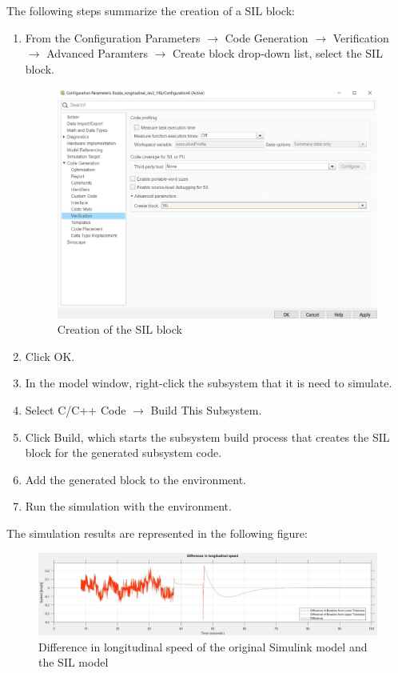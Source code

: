 \documentclass[12pt,a4paper]{report}
\begin{document}
The following steps summarize the creation of a SIL block:
\begin{enumerate}
	\item From the Configuration Parameters $\to$  Code Generation $\to$  Verification $\to$  Advanced Paramters $\to$  Create block drop-down list, select the SIL block.
	\begin{figure}[htbp]
		\centering
		\includegraphics[scale=0.4]{verification.jpg}
		\caption{Creation of the SIL block}
	\end{figure} \FloatBarrier
	\item Click OK.
	\item In the model window, right-click the subsystem that it is need to simulate.
	\item Select C/C++ Code $\to$  Build This Subsystem.
	\item Click Build, which starts the subsystem build process that creates the SIL block for the generated subsystem code.
	\item Add the generated block to the environment.
	\item Run the simulation with the environment.
\end{enumerate}

The simulation results are represented in the following figure:
\begin{figure}[htbp]
	\centering
	\includegraphics[scale=0.4]{sil_plot.jpg}
	\caption{Difference in longitudinal speed of the original Simulink model and the SIL model}
\end{figure} \FloatBarrier
\end{document}
